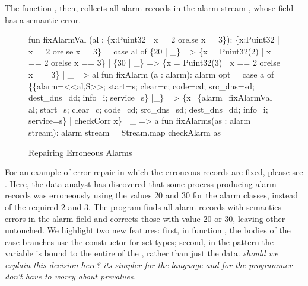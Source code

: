 \documentclass{entcs}
\begin{document}
The function , then,
collects all alarm records in the alarm stream , whose
 field has a semantic error.

\begin{figure}
  \centering
\begin{code}
fun fixAlarmVal (al : \{x:Puint32 | x==2 orelse x==3\}): 
  \{x:Puint32 | x==2 orelse x==3\} =
    case al of
      \{20 | _\} => \{x = Puint32(2) | x == 2 orelse x == 3\}
    | \{30 | _\} => \{x = Puint32(3) | x == 2 orelse x == 3\}
    | _ => al
\mbox{}
fun fixAlarm (a : alarm): alarm opt =
    case a of 
	\{\{alarm=<<al,S>>; start=s; clear=c; 
          code=cd; src_dns=sd; dest_dns=dd; 
	  info=i; service=s\} |_\} 
          => \{x=\{alarm=fixAlarmVal al; 
                 start=s; clear=c; 
                 code=cd; src_dns=sd; dest_dns=dd; 
                 info=i; service=s\}
              | checkCorr x\} 
      | _ => a
\mbox{}
fun fixAlarms(as : alarm stream): alarm stream =
    Stream.map checkAlarm as
\end{code}
  \caption{Repairing Erroneous Alarms}
  \label{fig:ex-error-repair}
\end{figure}

For an example of error repair in which the erroneous records are
fixed, please see . Here, the data analyst
has discovered that some process producing alarm records was
erroneously using the values $20$ and $30$ for the alarm classes,
instead of the required $2$ and $3$. The program finds all alarm
records with semantics errors in the alarm field and corrects those
with value $20$ or $30$, leaving other untouched. We highlight two new
features: first, in function , the bodies of the case
branches use the constructor for set types; second, in the pattern
 the variable  is bound to the entire \pvalue{} of
the  \pvalue{}, rather than just the data. {\em should we
  explain this decision here? its simpler for the language and for the
programmer - don't have to worry about prevalues.}
\end{document}
